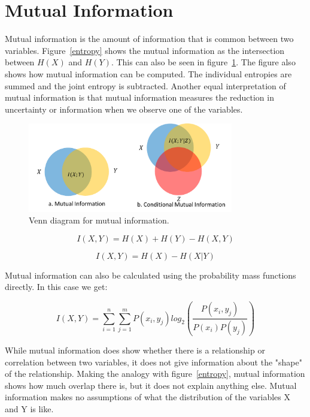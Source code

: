 \section{Mutual Information}
Mutual information is the amount of information that is common between two variables. Figure~\ref{entropy} shows the mutual information as the intersection between $H(X)$ and $H(Y)$. This can also be seen in figure~\ref{mutual}. The figure also shows how mutual information can be computed. The individual entropies are summed and the joint entropy is subtracted. Another equal interpretation of mutual information is that mutual information measures the reduction in uncertainty or information when we observe one of the variables.

\begin{figure}[!htb]
\caption{Venn diagram for mutual information.}
\label{mutual}
    \centering
    \includegraphics[width=0.8\textwidth]{fig/mutual}
\end{figure}

\begin{equation}\label{info:mutual}
I(X,Y) = H(X) + H(Y) - H(X,Y)
\end{equation}

\begin{equation}
I(X,Y) = H(X) - H(X|Y)
\end{equation}

Mutual information can also be calculated using the probability mass functions directly. In this case we get:

\begin{equation}
I(X,Y) = \sum_{i=1}^{n}\sum_{j=1}^{m}P(x_i, y_j)log_2(\frac{P(x_i, y_j)}{P(x_i)P(y_j)})
\end{equation}
    
While mutual information does show whether there is a relationship or correlation between two variables, it does not give information about the "shape" of the relationship. Making the analogy with figure~\ref{entropy}, mutual information shows how much overlap there is, but it does not explain anything else. Mutual information makes no assumptions of what the distribution of the variables X and Y is like. 

